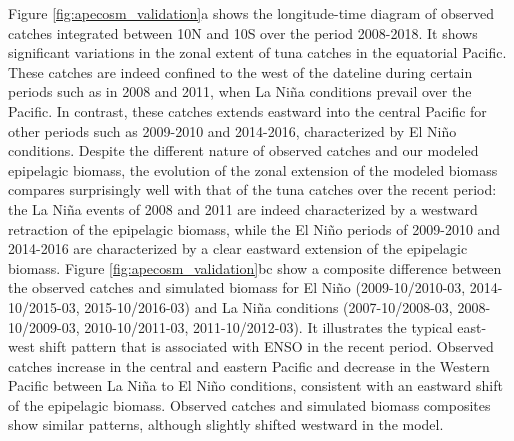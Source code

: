 Figure \ref{fig:apecosm_validation}a shows the longitude-time diagram of observed catches integrated between 10N and 10S over the period 2008-2018. It shows significant variations in the zonal extent of tuna catches in the equatorial Pacific. These catches are indeed confined to the west of the dateline during certain periods such as in 2008 and 2011, when La Niña conditions prevail over the Pacific. In contrast, these catches extends eastward into the central Pacific for other periods such as 2009-2010 and 2014-2016, characterized by El Niño conditions. Despite the different nature of observed catches and our modeled epipelagic biomass, the evolution of the zonal extension of the modeled biomass compares surprisingly well with that of the tuna catches over the recent period: the La Niña events of 2008 and 2011 are indeed characterized by a westward retraction of the epipelagic biomass, while the El Niño periods of 2009-2010 and 2014-2016 are characterized by a clear eastward extension of the epipelagic biomass. Figure \ref{fig:apecosm_validation}bc show a composite difference between the observed catches and simulated biomass for El Niño (2009-10/2010-03, 2014-10/2015-03, 2015-10/2016-03) and La Niña conditions (2007-10/2008-03, 2008-10/2009-03, 2010-10/2011-03, 2011-10/2012-03). It illustrates the typical east-west shift pattern that is associated with ENSO in the recent period. Observed catches increase in the central and eastern Pacific and decrease in the Western Pacific between La Niña to El Niño conditions, consistent with an eastward shift of the epipelagic biomass. Observed catches and simulated biomass composites show similar patterns, although slightly shifted westward in the model.

